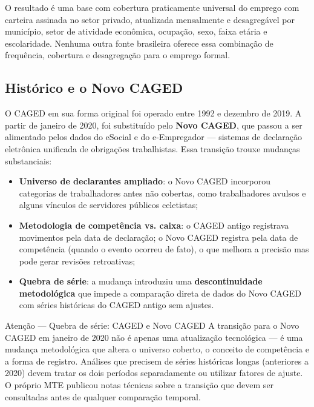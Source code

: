 O resultado é uma base com cobertura praticamente universal do emprego com carteira assinada no setor privado, atualizada mensalmente e desagregável por município, setor de atividade econômica, ocupação, sexo, faixa etária e escolaridade. Nenhuma outra fonte brasileira oferece essa combinação de frequência, cobertura e desagregação para o emprego formal.

\subsection{Histórico e o Novo CAGED}

O CAGED em sua forma original foi operado entre 1992 e dezembro de 2019. A partir de janeiro de 2020, foi substituído pelo \textbf{Novo CAGED}, que passou a ser alimentado pelos dados do eSocial e do e-Empregador — sistemas de declaração eletrônica unificada de obrigações trabalhistas. Essa transição trouxe mudanças substanciais:

\begin{itemize}
  \item \textbf{Universo de declarantes ampliado}: o Novo CAGED incorporou categorias de trabalhadores antes não cobertas, como trabalhadores avulsos e alguns vínculos de servidores públicos celetistas;
  \item \textbf{Metodologia de competência vs. caixa}: o CAGED antigo registrava movimentos pela data de declaração; o Novo CAGED registra pela data de competência (quando o evento ocorreu de fato), o que melhora a precisão mas pode gerar revisões retroativas;
  \item \textbf{Quebra de série}: a mudança introduziu uma \textbf{descontinuidade metodológica} que impede a comparação direta de dados do Novo CAGED com séries históricas do CAGED antigo sem ajustes.
\end{itemize}

\begin{boxatencao}{Atenção — Quebra de série: CAGED e Novo CAGED}
A transição para o Novo CAGED em janeiro de 2020 não é apenas uma atualização tecnológica — é uma mudança metodológica que altera o universo coberto, o conceito de competência e a forma de registro. Análises que precisem de séries históricas longas (anteriores a 2020) devem tratar os dois períodos separadamente ou utilizar fatores de ajuste. O próprio MTE publicou notas técnicas sobre a transição que devem ser consultadas antes de qualquer comparação temporal.
\end{boxatencao}


